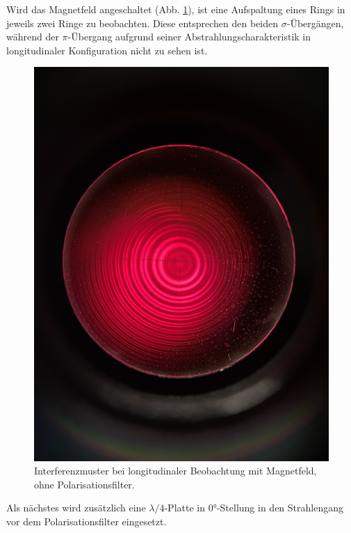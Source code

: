 \documentclass{article}
\begin{document}
\begin{multicols}{2}
Wird das Magnetfeld angeschaltet (Abb. \ref{fig:zeeman-longitudinal-mit-ohne}),
ist eine Aufspaltung eines Rings in jeweils zwei Ringe zu beobachten.
Diese entsprechen den beiden $\sigma$-Übergängen, während der $\pi$-Übergang aufgrund seiner Abstrahlungscharakteristik
in longitudinaler Konfiguration nicht zu sehen ist.
\begin{figure}[H]
  \centering
  \includegraphics[width=.8\linewidth]{zeeman-longitudinal-mit-ohne}
  \caption{Interferenzmuster bei longitudinaler Beobachtung mit Magnetfeld, ohne Polarisationsfilter.}
  \label{fig:zeeman-longitudinal-mit-ohne}
\end{figure}

Als nächstes wird zusätzlich eine $\lambda / 4$-Platte in \ang{0}-Stellung in den Strahlengang vor dem
Polarisationsfilter eingesetzt. 


\end{multicols}
\end{document}
